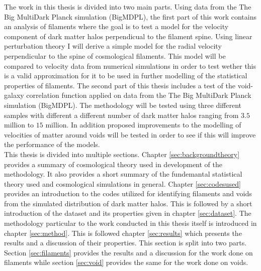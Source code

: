 The work in this thesis is divided into two main parts. Using data from the The Big MultiDark Planck simulation (BigMDPL)\cite{Multidark_dataset}, the first part of this work contains an analysis of filaments where the goal is to test a model for the velocity component of dark matter halos perpendicual to the filament spine. Using linear perturbation theory I will derive a simple model for the radial velocity perpendicular to the spine of cosmological filaments. This model will be compared to velocity data from numerical simulations in order to test wether this is a valid approximation for it to be used in further modelling of the statistical properties of filaments.
The second part of this thesis includes a test of the void-galaxy correlation function applied on data from the The Big MultiDark Planck simulation (BigMDPL)\cite{Multidark_dataset}. The methodology will be tested using three different samples with different a different number of dark matter halos ranging from $3.5$ million to $15$ million. In addition proposed improvements to the modelling of velocities of matter around voids\cite{Achitouv_streaming} will be tested in order to see if this will improve the performance of the models.\\\indent
This thesis is divided into multiple sections. Chapter \ref{sec:backgroundtheory} provides a summary of cosmological theory used in development of the methodology. It also provides a short summary of the fundemantal statistical theory used and cosmological simulations in general. Chapter \ref{sec:codesused} provides an introduction to the codes utilized for identifying filaments and voids from the simulated distribution of dark matter halos. This is followed by a short introduction of the dataset and its properties given in chapter \ref{sec:dataset}. The methodology particular to the work conducted in this thesis itself is introduced in chapter \ref{sec:method}. This is followed chapter \ref{sec:results} which presents the results and a discussion of their properties. This section is split into two parts. Section \ref{sec:filaments} provides the results and a discussion for the work done on filaments while section \ref{sec:void} provides the same for the work done on voids. 